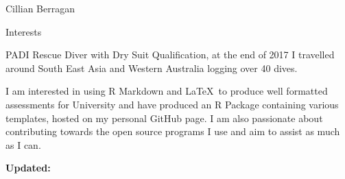 \documentclass{scrartcl}
\begin{document}
\begin{cv}{Cillian Berragan}
\begin{cvlist}{Interests}
\item[]
PADI Rescue Diver with Dry Suit Qualification, at the end of 2017 I travelled around South East Asia and Western Australia logging over 40 dives.

I am interested in using R Markdown and \LaTeX\ to produce well formatted assessments for University and have produced an R Package containing various templates, hosted on my personal GitHub page. I am also passionate about contributing towards the open source programs I use and aim to assist as much as I can.


\end{cvlist}

\vfill

\small \textbf{Updated:} \end{cv}
\end{document}

